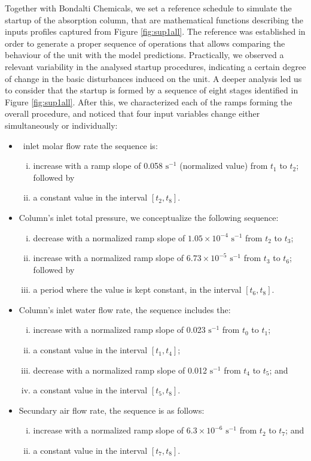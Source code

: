 \documentclass[journal=jacsat,manuscript=article]{achemso}
\newcommand{\nox}{\ce{NO_{\rmfamily{x}}}}
\begin{document}
Together with Bondalti Chemicals, we set a reference schedule to simulate the startup of the absorption column, that are mathematical functions describing the inputs profiles captured from Figure \ref{fig:sup1all}.
The reference was established in order to generate a proper sequence of operations that allows comparing the behaviour of the unit with the model predictions. Practically, we observed a relevant variability in the analysed startup procedures, indicating a certain degree of change in the basic disturbances induced on the unit. A deeper analysis led us to consider that the startup is formed by a sequence of eight stages identified in Figure  \ref{fig:sup1all}. After this, we characterized each of the ramps forming the overall procedure, and noticed that four input variables change either simultaneously or individually:
\begin{itemize}
	\item \nox~inlet molar flow rate the sequence is: 
	\begin{enumerate}[(i)]
		\item increase with a ramp slope of 0.058 $\text{s}^{-1}$ (normalized value) from $t_1$ to $t_2$; followed by
		\item a constant value in the interval $[t_2,t_8]$.
	\end{enumerate}
	\item Column's inlet total pressure, we conceptualize the following sequence:
	\begin{enumerate}[(i)]
		\item decrease with a normalized ramp slope of $1.05 \times 10^{-4}$ $\text{s}^{-1}$ from $t_2$ to $t_3$;
		\item increase with a normalized ramp slope of $6.73 \times 10^{-5}$ $\text{s}^{-1}$ from $t_3$ to $t_6$; followed by 
		\item a period where the value is kept constant, in the interval $[t_6,t_8]$.
	\end{enumerate}
	\item Column's inlet water flow rate, the sequence includes the: 
	\begin{enumerate}[(i)]
		\item increase with a normalized ramp slope of 0.023 $\text{s}^{-1}$ from $t_0$ to $t_1$;
		\item a constant value in the interval $[t_1,t_4]$;
		\item decrease with a normalized ramp slope of 0.012 $\text{s}^{-1}$ from $t_4$ to $t_5$; and 
		\item a constant value in the interval $[t_5,t_8]$.
	\end{enumerate}
	\item Secundary air flow rate, the sequence is as follows:
	\begin{enumerate}[(i)]
		\item increase with a normalized ramp slope of $6.3 \times 10^{-6}$ $\text{s}^{-1}$ from $t_2$ to $t_7$; and 
		\item a constant value in the interval $[t_7,t_8]$.
	\end{enumerate}
\end{itemize}
\end{document}
